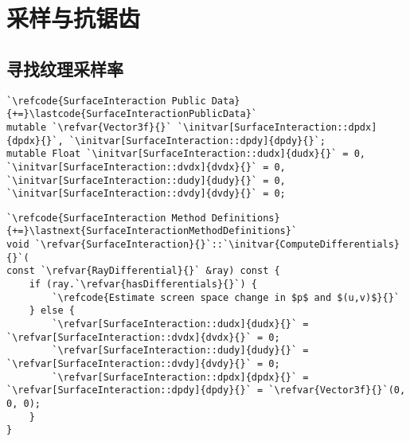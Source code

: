 \section{采样与抗锯齿}\label{sec:采样与抗锯齿}


\subsection{寻找纹理采样率}\label{sub:寻找纹理采样率}
\begin{lstlisting}
`\refcode{SurfaceInteraction Public Data}{+=}\lastcode{SurfaceInteractionPublicData}`
mutable `\refvar{Vector3f}{}` `\initvar[SurfaceInteraction::dpdx]{dpdx}{}`, `\initvar[SurfaceInteraction::dpdy]{dpdy}{}`;
mutable Float `\initvar[SurfaceInteraction::dudx]{dudx}{}` = 0, `\initvar[SurfaceInteraction::dvdx]{dvdx}{}` = 0, `\initvar[SurfaceInteraction::dudy]{dudy}{}` = 0, `\initvar[SurfaceInteraction::dvdy]{dvdy}{}` = 0;
\end{lstlisting}

\begin{lstlisting}
`\refcode{SurfaceInteraction Method Definitions}{+=}\lastnext{SurfaceInteractionMethodDefinitions}`
void `\refvar{SurfaceInteraction}{}`::`\initvar{ComputeDifferentials}{}`(
const `\refvar{RayDifferential}{}` &ray) const {
    if (ray.`\refvar{hasDifferentials}{}`) {
        `\refcode{Estimate screen space change in $p$ and $(u,v)$}{}`
    } else {
        `\refvar[SurfaceInteraction::dudx]{dudx}{}` = `\refvar[SurfaceInteraction::dvdx]{dvdx}{}` = 0;
        `\refvar[SurfaceInteraction::dudy]{dudy}{}` = `\refvar[SurfaceInteraction::dvdy]{dvdy}{}` = 0;
        `\refvar[SurfaceInteraction::dpdx]{dpdx}{}` = `\refvar[SurfaceInteraction::dpdy]{dpdy}{}` = `\refvar{Vector3f}{}`(0, 0, 0);
    }
}
\end{lstlisting}
